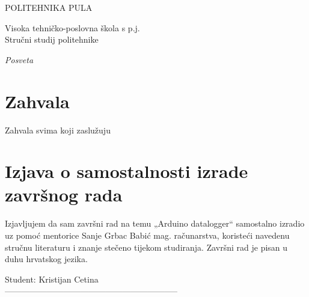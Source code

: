 \documentclass[11pt,a4paper]{report}
\author{
Kristijan Cetina \\{\small JMBAG: 2424011721} \\ {\href{mailto:kcetina@politehnika-pula.hr?subject=\mailFriendlynaslovRada}{{\footnotesize kcetina@politehnika-pula.hr}}}}
\title{\naslovRada}
\date{Pula, \today}
\begin{document}
\pgfplotsset{width=\textwidth,compat=newest}

\begin{titlepage}
\clearpage
\begin{center}
\begin{Huge}
POLITEHNIKA PULA\\
\end{Huge}
\begin{LARGE}
Visoka tehničko-poslovna škola s p.j.\\
Stručni studij politehnike\\
\end{LARGE}
\end{center}
\vspace{3cm}
{\let\newpage\relax\maketitle}
\thispagestyle{empty}
\vfill

\end{titlepage}
\newpage
\vspace*{\fill}
\begin{flushright}
\textit{Posveta}
\end{flushright}
\vspace*{\fill}
\newpage
\section*{Zahvala}
Zahvala svima koji zaslužuju
\newpage
\section*{Izjava o samostalnosti izrade završnog rada}
Izjavljujem da sam završni rad na temu „Arduino datalogger“ samostalno izradio uz pomoć mentorice Sanje Grbac Babić mag. računarstva, koristeći navedenu stručnu literaturu i znanje stečeno tijekom studiranja. Završni rad je pisan u duhu hrvatskog jezika.
\vspace{3cm}
\begin{flushright}
Student: Kristijan Cetina\\
\vspace{15mm}
--------------------------------------------------------------
\end{flushright}
\newpage
\begin{abstract}

U ovom radu predstavljam

\vspace{3cm}

\begin{tabbing}
\hspace{50pt}\=\kill
 Kolegij: \> Elektronike\\
 Mentorica: \> Sanja Grbac Babić, mag. računarstva, v.predavač
\end{tabbing} 

\end{abstract}
\newpage
\tableofcontents
\listoftables	%
\listoffigures	%
\end{document}
